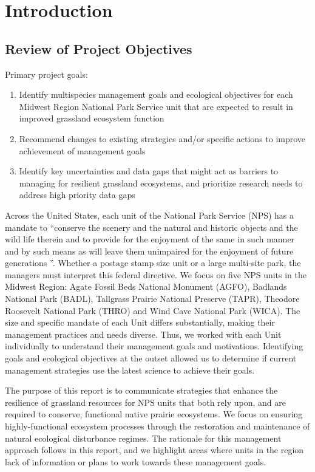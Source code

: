 \section{Introduction}\label{sec:intro}

\subsection{Review of Project Objectives}\label{ssec:objectives}

Primary project goals:

\begin{enumerate}
	\item Identify multi\textendash species management goals and ecological objectives for each Midwest Region National Park Service unit that are expected to result in improved grassland ecosystem function
	\item 	Recommend changes to existing strategies and/or specific actions to improve achievement of management goals 
	\item Identify key uncertainties and data gaps that might act as barriers to managing for resilient grassland ecosystems, and prioritize research needs to address high priority data gaps
\end{enumerate}

Across the United States, each unit of the National Park Service (NPS) has a mandate to ``conserve the scenery and the natural and historic objects and the wild life therein and to provide for the enjoyment of the same in such manner and by such means as will leave them unimpaired for the enjoyment of future generations \citep{organicact1916}''. 
Whether a postage stamp size unit or a large multi-site park, the managers must interpret this federal directive. 
We focus on five NPS units in the Midwest Region: Agate Fossil Beds National Monument (AGFO), Badlands National Park (BADL), Tallgrass Prairie National Preserve (TAPR), Theodore Roosevelt National Park (THRO) and Wind Cave National Park (WICA).
The size and specific mandate of each Unit differs substantially, making their management practices and needs diverse. 
Thus, we worked with each Unit individually to understand their management goals and motivations. 
Identifying goals and ecological objectives at the outset allowed us to determine if current management strategies use the latest science to achieve their goals.

The purpose of this report is to communicate strategies that enhance the resilience of grassland resources for NPS units that both rely upon, and are required to conserve, functional native prairie ecosystems. 
We focus on ensuring highly-functional ecosystem processes through the restoration and maintenance of natural ecological disturbance regimes. 
The rationale for this management approach follows in this report, and we highlight areas where units in the region lack of information or plans to work towards these management goals.

